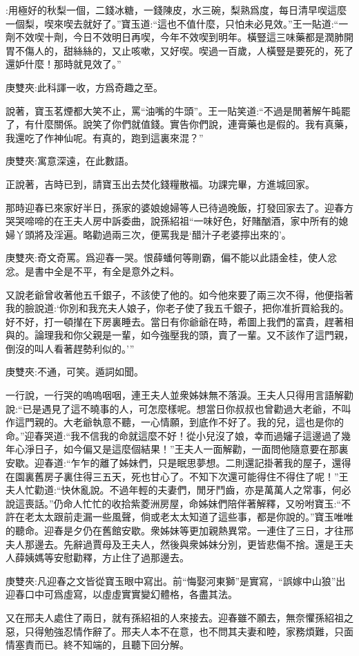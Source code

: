 \begin{parag}
:用極好的秋梨一個，二錢冰糖，一錢陳皮，水三碗，梨熟爲度，每日清早喫這麼一個梨，喫來喫去就好了。”寶玉道:“這也不值什麼，只怕未必見效。”王一貼道:“一劑不效喫十劑，今日不效明日再喫，今年不效喫到明年。橫豎這三味藥都是潤肺開胃不傷人的，甜絲絲的，又止咳嗽，又好喫。喫過一百歲，人橫豎是要死的，死了還妒什麼！那時就見效了。”\begin{note}庚雙夾:此科諢一收，方爲奇趣之至。\end{note}說著，寶玉茗煙都大笑不止，罵“油嘴的牛頭”。王一貼笑道:“不過是閒著解午盹罷了，有什麼關係。說笑了你們就值錢。實告你們說，連膏藥也是假的。我有真藥，我還吃了作神仙呢。有真的，跑到這裏來混？”\begin{note}庚雙夾:寓意深遠，在此數語。\end{note}正說著，吉時已到，請寶玉出去焚化錢糧散福。功課完畢，方進城回家。
\end{parag}


\begin{parag}
    那時迎春已來家好半日，孫家的婆娘媳婦等人已待過晚飯，打發回家去了。迎春方哭哭啼啼的在王夫人房中訴委曲，說孫紹祖“一味好色，好賭酗酒，家中所有的媳婦丫頭將及淫遍。略勸過兩三次，便罵我是‘醋汁子老婆擰出來的’。\begin{note}庚雙夾:奇文奇罵。爲迎春一哭。恨薛蟠何等剛霸，偏不能以此語金桂，使人忿忿。是書中全是不平，有全是意外之料。\end{note}又說老爺曾收著他五千銀子，不該使了他的。如今他來要了兩三次不得，他便指著我的臉說道:‘你別和我充夫人娘子，你老子使了我五千銀子，把你准折買給我的。好不好，打一頓攆在下房裏睡去。當日有你爺爺在時，希圖上我們的富貴，趕著相與的。論理我和你父親是一輩，如今強壓我的頭，賣了一輩。又不該作了這門親，倒沒的叫人看著趕勢利似的。’”\begin{note}庚雙夾:不通，可笑。遁詞如聞。\end{note}一行說，一行哭的嗚嗚咽咽，連王夫人並衆姊妹無不落淚。王夫人只得用言語解勸說:“已是遇見了這不曉事的人，可怎麼樣呢。想當日你叔叔也曾勸過大老爺，不叫作這門親的。大老爺執意不聽，一心情願，到底作不好了。我的兒，這也是你的命。”迎春哭道:“我不信我的命就這麼不好！從小兒沒了娘，幸而過嬸子這邊過了幾年心淨日子，如今偏又是這麼個結果！”王夫人一面解勸，一面問他隨意要在那裏安歇。迎春道:“乍乍的離了姊妹們，只是眠思夢想。二則還記掛著我的屋子，還得在園裏舊房子裏住得三五天，死也甘心了。不知下次還可能得住不得住了呢！”王夫人忙勸道:“快休亂說。不過年輕的夫妻們，閒牙鬥齒，亦是萬萬人之常事，何必說這喪話。”仍命人忙忙的收拾紫菱洲房屋，命姊妹們陪伴著解釋，又吩咐寶玉:“不許在老太太跟前走漏一些風聲，倘或老太太知道了這些事，都是你說的。”寶玉唯唯的聽命。迎春是夕仍在舊館安歇。衆姊妹等更加親熱異常。一連住了三日，才往邢夫人那邊去。先辭過賈母及王夫人，然後與衆姊妹分別，更皆悲傷不捨。還是王夫人薛姨媽等安慰勸釋，方止住了過那邊去。\begin{note}庚雙夾:凡迎春之文皆從寶玉眼中寫出。前“悔娶河東獅”是實寫，“誤嫁中山狼”出迎春口中可爲虛寫，以虛虛實實變幻體格，各盡其法。\end{note}又在邢夫人處住了兩日，就有孫紹祖的人來接去。迎春雖不願去，無奈懼孫紹祖之惡，只得勉強忍情作辭了。邢夫人本不在意，也不問其夫妻和睦，家務煩難，只面情塞責而已。終不知端的，且聽下回分解。
\end{parag}


